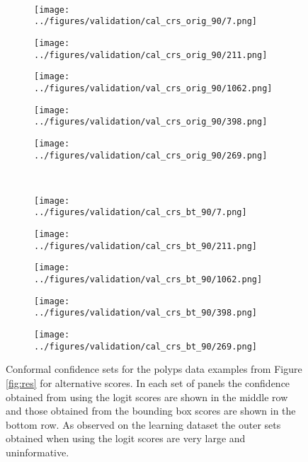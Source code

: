 \begin{figure}[h!]
\begin{subfigure}{0.19\textwidth}
		\label{fig:1}
	\end{subfigure}
	\vspace{-0.35cm}
	\\
	\begin{subfigure}{0.19\textwidth}
		\centering
		\texttt{[image: ../figures/validation/cal\_crs\_orig\_90/7.png]}
		\label{fig:1}
	\end{subfigure}
	\begin{subfigure}{0.19\textwidth}
		\centering
		\texttt{[image: ../figures/validation/cal\_crs\_orig\_90/211.png]}
		\label{fig:1}
	\end{subfigure}
	\begin{subfigure}{0.19\textwidth}
		\centering
		\texttt{[image: ../figures/validation/val\_crs\_orig\_90/1062.png]}
		\label{fig:1}
	\end{subfigure}
	\begin{subfigure}{0.19\textwidth}
		\centering
		\texttt{[image: ../figures/validation/val\_crs\_orig\_90/398.png]}
		\label{fig:1}
	\end{subfigure}
	\begin{subfigure}{0.19\textwidth}
		\centering
		\texttt{[image: ../figures/validation/cal\_crs\_orig\_90/269.png]}
		\label{fig:1}
	\end{subfigure}
	\vspace{-0.35cm}
	\\
	\begin{subfigure}{0.19\textwidth}
		\centering
		\texttt{[image: ../figures/validation/cal\_crs\_bt\_90/7.png]}
		\label{fig:1}
	\end{subfigure}
	\begin{subfigure}{0.19\textwidth}
		\centering
		\texttt{[image: ../figures/validation/cal\_crs\_bt\_90/211.png]}
		\label{fig:1}
	\end{subfigure}
	\begin{subfigure}{0.19\textwidth}
		\centering
		\texttt{[image: ../figures/validation/val\_crs\_bt\_90/1062.png]}
		\label{fig:1}
	\end{subfigure}
	\begin{subfigure}{0.19\textwidth}
		\centering
		\texttt{[image: ../figures/validation/val\_crs\_bt\_90/398.png]}
		\label{fig:1}
	\end{subfigure}
	\begin{subfigure}{0.19\textwidth}
		\centering
		\texttt{[image: ../figures/validation/cal\_crs\_bt\_90/269.png]}
		\label{fig:1}
	\end{subfigure}
	\label{fig:grid}
	\caption{Conformal confidence sets for the polyps data examples from Figure \ref{fig:res} for alternative scores. In each set of panels the confidence obtained from using the logit scores are shown in the middle row and those obtained from the bounding box scores are shown in the bottom row. As observed on the learning dataset the outer sets obtained when using the logit scores are very large and uninformative.}\label{fig:polpysex}
\end{figure}
\newpage

